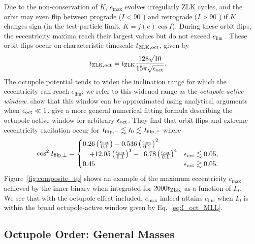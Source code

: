 \documentclass[
        fleqn,
        usenatbib,
    ]{mnras}
\newcommand*{\p}[1]{\left(#1\right)}
\begin{document}
Due to the non-conservation of $K$, $e_{\max}$ evolves irregularly ZLK cycles,
and the orbit may even flip between prograde ($I < 90^\circ$) and retrograde ($I
> 90^\circ$) if $K$ changes sign (in the test-particle limit, $K = j(e) \cos
I$). During these orbit flips, the eccentricity maxima reach their largest
values but do not exceed $e_{\lim}$ \citep{lithwick2011eccentric, LML15,
anderson2016formation}. These orbit flips occur on characteristic timescale
$t_{\rm ZLK, oct}$, given by \citep{antognini2015timescales}
\begin{equation}
    t_{\rm ZLK, oct} = t_{\rm ZLK}\frac{128\sqrt{10}}{
        15\pi\sqrt{\epsilon_{\rm oct}}}.\label{eq:def_tzlkoct}
\end{equation}
The octupole potential tends to widen the inclination range for which the
eccentricity can reach $e_{\lim}$; we refer to this widened range as the
\emph{octupole-active window}. \citet{katz2011long} show that this window can be
approximated using analytical arguments when $\epsilon_{\rm oct} \ll 1$.
\citet{MLL16} give a more general numerical fitting formula describing the
octupole-active window for arbitrary $\epsilon_{\rm oct}$. They find that orbit
flips and extreme eccentricity excitation occur for $I_{\rm flip, -} \lesssim
I_0 \lesssim I_{\rm flip, +}$ where
\begin{equation}
    \cos^2 I_{\rm flip, \pm} = \begin{cases}
        0.26\p{\frac{\epsilon_{\rm oct}}{0.1}}
            - 0.536\p{\frac{\epsilon_{\rm oct}}{0.1}}^2\\
            \quad + 12.05\p{\frac{\epsilon_{\rm oct}}{0.1}}^3
            - 16.78\p{\frac{\epsilon_{\rm oct}}{0.1}}^4
            & \epsilon_{\rm oct} \lesssim 0.05,\\
        0.45 & \epsilon_{\rm oct} \gtrsim 0.05.
    \end{cases} \label{eq:I_oct_MLL}
\end{equation}
Figure~\ref{fig:composite_tp} shows an example of the maximum eccentricity
$e_{\max}$ achieved by the inner binary when integrated for $2000t_{\rm ZLK}$ as
a function of $I_0$. We see that with the octupole effect included, $e_{\max}$
indeed attains $e_{\lim}$ when $I_0$ is within the broad octupole-active window
given by Eq.~\eqref{eq:I_oct_MLL}.

\subsection{Octupole Order: General Masses}\label{ss:oct_gen}
\end{document}
